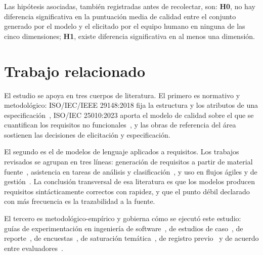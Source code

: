 \documentclass[11pt,a4paper]{article}
\begin{document}
Las hip\'otesis asociadas, tambi\'en registradas antes de recolectar, son:
\textbf{H0}, no hay diferencia significativa en la puntuaci\'on media de calidad entre
el conjunto generado por el modelo y el elicitado por el equipo humano en ninguna de las
cinco dimensiones; \textbf{H1}, existe diferencia significativa en al menos una
dimensi\'on.

\section{Trabajo relacionado}

El estudio se apoya en tres cuerpos de literatura. El primero es normativo y
metodol\'ogico: ISO/IEC/IEEE 29148:2018 fija la estructura y los atributos de una
especificaci\'on~\cite{iso29148_2018}, ISO/IEC 25010:2023 aporta el modelo de calidad
sobre el que se cuantifican los requisitos no funcionales~\cite{iso25010_2023}, y las
obras de referencia del \'area~\cite{pohl2010requirements,sommerville2015software,%
washizaki2024swebok} sostienen las decisiones de elicitaci\'on y especificaci\'on.

El segundo es el de modelos de lenguaje aplicados a requisitos. Los trabajos revisados
se agrupan en tres l\'ineas: generaci\'on de requisitos a partir de material
fuente~\cite{ronanki2023investigating,gorer2023generating,almeida2025elicitation,%
lubos2024leveraging}, asistencia en tareas de an\'alisis y
clasificaci\'on~\cite{arora2024advancing,vogelsang2024using,hymel2025analysis}, y uso
en flujos \'agiles y de gesti\'on~\cite{ray2023agile,ronanki2023chatgpt,challa2025gas,%
talu2025exploring}. La conclusi\'on transversal de esa literatura es que los modelos
producen requisitos sint\'acticamente correctos con rapidez, y que el punto d\'ebil
declarado con m\'as frecuencia es la trazabilidad a la fuente.

El tercero es metodol\'ogico-emp\'irico y gobierna c\'omo se ejecut\'o este estudio:
gu\'ias de experimentaci\'on en ingenier\'ia de
software~\cite{wohlin2012experimentation,montgomery2022empirical}, de estudios de
caso~\cite{runeson2009guidelines}, de reporte~\cite{jedlitschka2008reporting}, de
encuestas~\cite{molleri2020empirically,kitchenham2007guidelines}, de saturaci\'on
tem\'atica~\cite{hennink2017code,guest2006how}, de registro
previo~\cite{nosek2018preregistration} y de acuerdo entre
evaluadores~\cite{cohen1960coefficient,fleiss1971measuring,landis1977measurement}.
\end{document}
